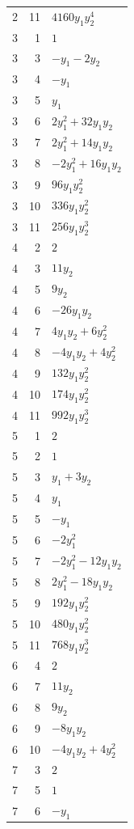 \documentclass[10pt,a4paper]{article}
\begin{document}
{\begin{longtable}{rrp{125mm}}
2 & 11 & $4160 y_{1} y_{2}^{4}$\\
3 & 1 & $1$\\
3 & 3 & $- y_{1} - 2 y_{2}$\\
3 & 4 & $- y_{1}$\\
3 & 5 & $y_{1}$\\
3 & 6 & $2 y_{1}^{2} + 32 y_{1} y_{2}$\\
3 & 7 & $2 y_{1}^{2} + 14 y_{1} y_{2}$\\
3 & 8 & $- 2 y_{1}^{2} + 16 y_{1} y_{2}$\\
3 & 9 & $96 y_{1} y_{2}^{2}$\\
3 & 10 & $336 y_{1} y_{2}^{2}$\\
3 & 11 & $256 y_{1} y_{2}^{3}$\\
4 & 2 & $2$\\
4 & 3 & $11 y_{2}$\\
4 & 5 & $9 y_{2}$\\
4 & 6 & $- 26 y_{1} y_{2}$\\
4 & 7 & $4 y_{1} y_{2} + 6 y_{2}^{2}$\\
4 & 8 & $- 4 y_{1} y_{2} + 4 y_{2}^{2}$\\
4 & 9 & $132 y_{1} y_{2}^{2}$\\
4 & 10 & $174 y_{1} y_{2}^{2}$\\
4 & 11 & $992 y_{1} y_{2}^{3}$\\
5 & 1 & $2$\\
5 & 2 & $1$\\
5 & 3 & $y_{1} + 3 y_{2}$\\
5 & 4 & $y_{1}$\\
5 & 5 & $- y_{1}$\\
5 & 6 & $- 2 y_{1}^{2}$\\
5 & 7 & $- 2 y_{1}^{2} - 12 y_{1} y_{2}$\\
5 & 8 & $2 y_{1}^{2} - 18 y_{1} y_{2}$\\
5 & 9 & $192 y_{1} y_{2}^{2}$\\
5 & 10 & $480 y_{1} y_{2}^{2}$\\
5 & 11 & $768 y_{1} y_{2}^{3}$\\
6 & 4 & $2$\\
6 & 7 & $11 y_{2}$\\
6 & 8 & $9 y_{2}$\\
6 & 9 & $- 8 y_{1} y_{2}$\\
6 & 10 & $- 4 y_{1} y_{2} + 4 y_{2}^{2}$\\
7 & 3 & $2$\\
7 & 5 & $1$\\
7 & 6 & $- y_{1}$\\

\end{longtable}}
\end{document}
